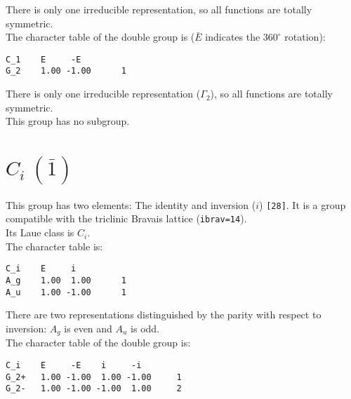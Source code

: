 \documentclass[12pt,a4paper,twoside]{report}
\begin{document}
There is only one irreducible representation, so all functions are 
totally symmetric. \\
The character table of the double group is ($\bar E$ indicates the
$360^\circ$ rotation): 

\begin{tcolorbox}
\begin{footnotesize}
\begin{verbatim}
C_1    E     -E   
G_2    1.00 -1.00      1
\end{verbatim}
\end{footnotesize}
\end{tcolorbox}

There is only one irreducible representation ($\Gamma_2$), 
so all functions are totally symmetric. \\
This group has no subgroup.

\newpage
{\color{coral}\section{$C_i\ (\bar 1)$}}
\color{black}
This group has two elements: The identity and inversion ($i$) \texttt{[28]}.
It is a group compatible with the triclinic Bravais lattice 
(\texttt{ibrav=14}). \\
Its Laue class is $C_i$. \\
The character table is:

\begin{tcolorbox}
\begin{footnotesize}
\begin{verbatim}
C_i    E     i    
A_g    1.00  1.00      1
A_u    1.00 -1.00      1
\end{verbatim}
\end{footnotesize}
\end{tcolorbox}

There are two representations distinguished by the parity
with respect to inversion: $A_g$ is even and $A_u$ is odd. \\
The character table of the double group is: 

\begin{tcolorbox}
\begin{footnotesize}
\begin{verbatim}
C_i    E     -E    i     -i   
G_2+   1.00 -1.00  1.00 -1.00     1
G_2-   1.00 -1.00 -1.00  1.00     2
\end{verbatim}
\end{footnotesize}
\end{tcolorbox}
\end{document}
